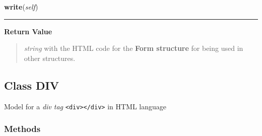     \label{module_Web:Form:write}

    \vspace{0.5ex}

\hspace{.8\funcindent}\begin{boxedminipage}{\funcwidth}

    \raggedright \textbf{write}(\textit{self})

    \vspace{-1.5ex}

    \rule{\textwidth}{0.5\fboxrule}
\setlength{\parskip}{2ex}
\setlength{\parskip}{1ex}
      \textbf{Return Value}
    \vspace{-1ex}

      \begin{quote}

\emph{string} with the HTML code for the \textbf{Form structure} for being used in other structures.
      \end{quote}

    \end{boxedminipage}



\subsection{Class DIV}

    \label{module_Web:DIV}

Model for a \emph{div tag} \texttt{<div></div>} in HTML language


  \subsubsection{Methods}

